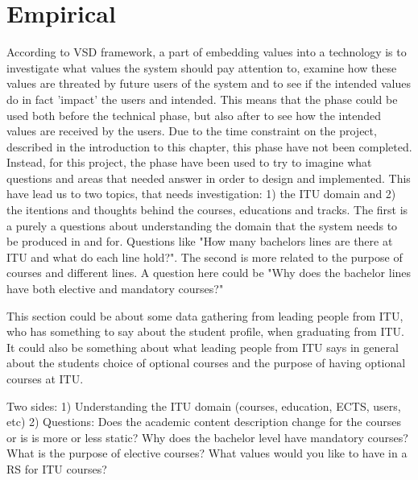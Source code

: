 \section{Empirical}
According to VSD framework, a part of embedding values into a technology is to investigate what values the system should pay attention to, examine how these values are threated by future users of the system and to see if the intended values do in fact 'impact' the users and intended. This means that the phase could be used both before the technical phase, but also after to see how the intended values are received by the users. 
Due to the time constraint on the project, described in the introduction to this chapter, this phase have not been completed. Instead, for this project, the phase have been used to try to imagine what questions and areas that needed answer in order to design and implemented. This have lead us to two topics, that needs investigation: 1) the ITU domain and 2) the itentions and thoughts behind the courses, educations and tracks. The first is a purely a questions about understanding the domain that the system needs to be produced in and for. Questions like "How many bachelors lines are there at ITU and what do each line hold?". The second is more related to the purpose of courses and different lines. A question here could be "Why does the bachelor lines have both elective and mandatory courses?"

This section could be about some data gathering from leading people from ITU, who has something to say about the student profile, when graduating from ITU. It could also be something about what leading people from ITU says in general about the students choice of optional courses and the purpose of having optional courses at ITU. 

Two sides:
1) Understanding the ITU domain (courses, education, ECTS, users, etc)
2) Questions:
Does the academic content description change for the courses or is is more or less static?
Why does the bachelor level have mandatory courses?
What is the purpose of elective courses?
What values would you like to have in a RS for ITU courses?


